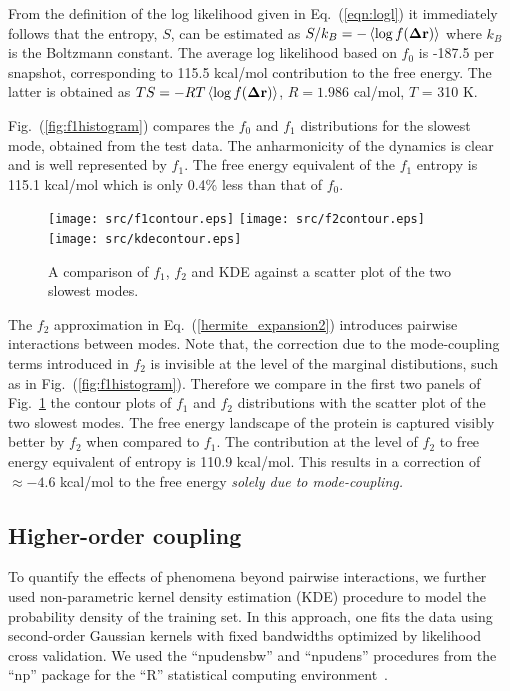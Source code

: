 \documentclass[12pt]{iopart}
\begin{document}
From the definition of the log likelihood given in
Eq.~(\ref{eqn:logl}) it immediately follows that the entropy, $S$,
can be estimated as $S/k_B = -\left< \log f({\bf\Delta r}) \right>$ where
$k_B$ is the Boltzmann constant.  
The average log likelihood based on
$f_0$ is -187.5 per snapshot, corresponding to 115.5 kcal/mol
contribution to the free energy.  The latter is obtained as $TS = -RT \left< \log f({\bf\Delta r}) \right>$, $R=1.986$ cal/mol, $T$ = 310 K.

Fig.~(\ref{fig:f1histogram}) compares the $f_0$ and $f_1$
distributions for the slowest mode, obtained from the test data. The
anharmonicity of the dynamics is clear and is well represented by
$f_1$.  The free energy equivalent of the $f_1$ entropy is 115.1
kcal/mol which is only 0.4\% less than that of $f_0$. 

\begin{figure}[ht!]
   \texttt{[image: src/f1contour.eps]}
   \texttt{[image: src/f2contour.eps]}
   \texttt{[image: src/kdecontour.eps]}
\caption{A comparison of $f_1$, $f_2$ and KDE against a scatter plot of the
  two slowest modes.}
\label{fig:contour}
\end{figure}

The $f_2$ approximation in Eq.~(\ref{hermite_expansion2}) introduces
pairwise interactions between modes. Note that, the correction due to
the mode-coupling terms introduced in $f_2$ is invisible at the level
of the marginal distibutions, such as in
Fig.~(\ref{fig:f1histogram}). Therefore we compare in the first two
panels of Fig.~\ref{fig:contour} the contour plots of $f_1$ and
$f_2$ distributions with the scatter plot of the two slowest 
modes. The free energy landscape of the protein is captured visibly
better by $f_2$ when compared to $f_1$. The contribution at the level
of $f_2$ to free energy equivalent of entropy is 110.9 kcal/mol. This
results in a correction of $\approx -4.6$ kcal/mol to the free energy
{\it solely due to mode-coupling.}

\subsection{Higher-order coupling}

To quantify the effects of phenomena beyond pairwise interactions, we
further used non-parametric kernel density estimation (KDE) procedure
to model the probability density of the training set.  In this
approach, one fits the data using second-order Gaussian kernels with
fixed bandwidths optimized by likelihood cross validation.  We used
the ``npudensbw'' and ``npudens'' procedures from the ``np'' package
for the ``R'' statistical computing environment~\cite{hayfield2008nonparametric}.
\end{document}
